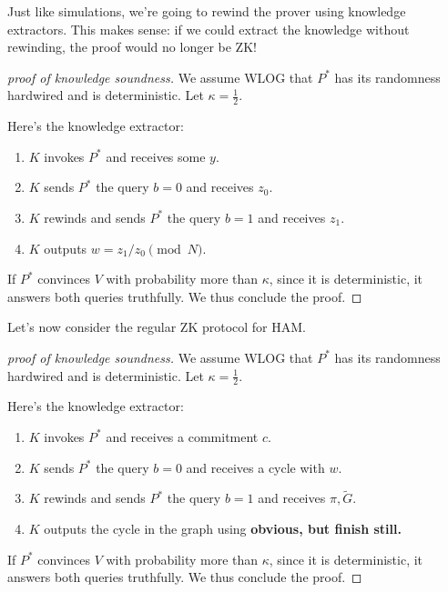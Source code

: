 \documentclass{article}
\theoremstyle{definition}
\begin{document}
Just like simulations, we're going to rewind the prover using knowledge extractors. This makes sense:
if we could extract the knowledge without rewinding, the proof would no longer be ZK!

\begin{proof}[proof of knowledge soundness]
    We assume WLOG that $P^{*}$ has its randomness hardwired and is
    deterministic. Let $\kappa = \frac{1}{2}$.

    Here's the knowledge extractor:
    \begin{enumerate}
        \item $K$ invokes $P^{*}$ and receives some $y$.
        \item $K$ sends $P^{*}$ the query $b = 0$ and receives $z_{0}$.
        \item $K$ rewinds and sends $P^{*}$ the query $b = 1$ and receives $z_{1}$.
        \item $K$ outputs $w = z_{1}/z_{0} \pmod{N}$.
    \end{enumerate}

    If $P^{*}$ convinces $V$ with probability more than $\kappa$, since it is deterministic,
    it answers both queries truthfully. We thus conclude the proof.
\end{proof}

Let's now consider the regular ZK protocol for HAM.

\begin{proof}[proof of knowledge soundness]
    We assume WLOG that $P^{*}$ has its randomness hardwired and is
    deterministic. Let $\kappa = \frac{1}{2}$.

    Here's the knowledge extractor:
    \begin{enumerate}
        \item $K$ invokes $P^{*}$ and receives a commitment $c$.
        \item $K$ sends $P^{*}$ the query $b = 0$ and receives a cycle with $w$.
        \item $K$ rewinds and sends $P^{*}$ the query $b = 1$ and receives $\pi, \tilde{G}$.
        \item $K$ outputs the cycle in the graph using \textbf{obvious, but finish still.}
    \end{enumerate}

    If $P^{*}$ convinces $V$ with probability more than $\kappa$, since it is deterministic,
    it answers both queries truthfully. We thus conclude the proof.
\end{proof}
\end{document}
